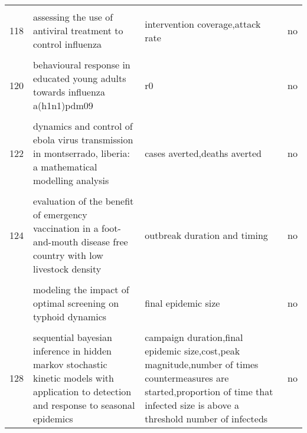\documentclass[
]{article}
\begin{document}
\begin{landscape}
\begin{longtable}{l>{\raggedright\arraybackslash}p{4cm}>{\raggedright\arraybackslash}p{6cm}l}
\cellcolor{gray!6}{117} & \cellcolor{gray!6}{assessing the impact of travel restrictions on international spread of the 2014 west african ebola epidemic} & \cellcolor{gray!6}{risk of case importation} & \cellcolor{gray!6}{yes}\\
118 & assessing the use of antiviral treatment to control influenza & intervention coverage,attack rate & no\\
\cellcolor{gray!6}{119} & \cellcolor{gray!6}{behavior in the time of cholera: evidence from the 2008-2009 cholera outbreak in zimbabwe} & \cellcolor{gray!6}{incidence} & \cellcolor{gray!6}{yes}\\
120 & behavioural response in educated young adults towards influenza a(h1n1)pdm09 & r0 & no\\
\addlinespace
\cellcolor{gray!6}{121} & \cellcolor{gray!6}{cover your cough! quantifying the benefits of a localized healthy behavior intervention on flu epidemics in washington dc} & \cellcolor{gray!6}{final epidemic size,timing of peak,number of simulations with epidemic outbreak,peak infections} & \cellcolor{gray!6}{no}\\
122 & dynamics and control of ebola virus transmission in montserrado, liberia: a mathematical modelling analysis & cases averted,deaths averted & no\\
\cellcolor{gray!6}{123} & \cellcolor{gray!6}{estimating the effectiveness of early control measures through school absenteeism surveillance in observed outbreaks at rural schools in hubei, china} & \cellcolor{gray!6}{attack rate,extra protective rate} & \cellcolor{gray!6}{no}\\
124 & evaluation of the benefit of emergency vaccination in a foot-and-mouth disease free country with low livestock density & outbreak duration and timing & no\\
\cellcolor{gray!6}{125} & \cellcolor{gray!6}{modeling the dynamics of oral poliovirus vaccine cessation} & \cellcolor{gray!6}{incidence,vaccine-derived virus prevalence,population immunity} & \cellcolor{gray!6}{no}\\
\addlinespace
126 & modeling the impact of optimal screening on typhoid dynamics & final epidemic size & no\\
\cellcolor{gray!6}{127} & \cellcolor{gray!6}{modeling the influence of environment and intervention oncholera in haiti} & \cellcolor{gray!6}{final epidemic size} & \cellcolor{gray!6}{no}\\
128 & sequential bayesian inference in hidden markov stochastic kinetic models with application to detection and response to seasonal epidemics & campaign duration,final epidemic size,cost,peak magnitude,number of times countermeasures are started,proportion of time that infected size is above a threshold number of infecteds & no\\

\end{longtable}
\end{landscape}
\end{document}
